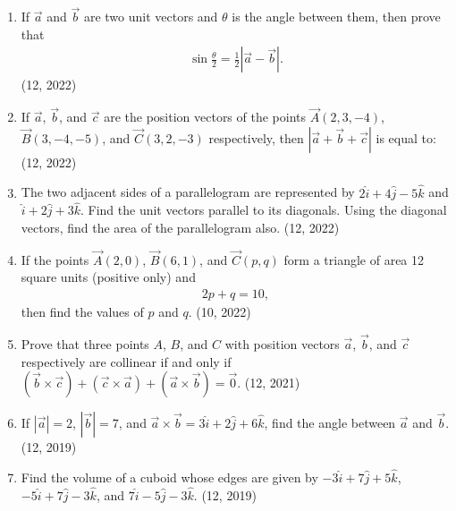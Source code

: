 \begin{enumerate}[label=\thesubsection.\arabic*,ref=\thesubsection.\theenumi]
    \item If $\overrightarrow{a}$ and $\overrightarrow{b}$ are two unit vectors and $\theta$ is the angle between them, then prove that
    \begin{align*}
        \sin \frac{\theta}{2} = \frac{1}{2} \left| \overrightarrow{a} - \overrightarrow{b} \right|.
    \end{align*}
    \hfill (12, 2022)
    \item If $\overrightarrow{a}$, $\overrightarrow{b}$, and $\overrightarrow{c}$ are the position vectors of the points $\vec{A}(2, 3, -4)$, $\vec{B}(3, -4, -5)$, and $\vec{C}(3, 2, -3)$ respectively, then $\left| \overrightarrow{a} + \overrightarrow{b} + \overrightarrow{c} \right|$ is equal to:
    \hfill (12, 2022)
    \item The two adjacent sides of a parallelogram are represented by $2\hat{i} + 4\hat{j} - 5\hat{k}$ and $\hat{i} + 2\hat{j} + 3\hat{k}$. Find the unit vectors parallel to its diagonals. Using the diagonal vectors, find the area of the parallelogram also.
    \hfill (12, 2022)
    \item If the points $\vec{A}(2,0)$, $\vec{B}(6,1)$, and $\vec{C}(p, q)$ form a triangle of area 12 square units (positive only) and
    \begin{align*}
        2p + q = 10,
    \end{align*}
    then find the values of $p$ and $q$.
    \hfill (10, 2022)
	\item Prove that three points $A$, $B$, and $C$ with position vectors $\vec{a}$, $\vec{b}$, and $\vec{c}$ respectively are collinear if and only if $(\vec{b} \times \vec{c}) + (\vec{c} \times \vec{a}) + (\vec{a} \times \vec{b}) = \vec{0}$. \hfill (12, 2021)
	\item If $|\overrightarrow{a}| = 2$, $|\overrightarrow{b}| = 7$, and $\overrightarrow{a} \times \overrightarrow{b} = 3\hat{i} + 2\hat{j} + 6\hat{k}$, find the angle between $\overrightarrow{a}$ and $\overrightarrow{b}$. \hfill (12, 2019)
	
	\item Find the volume of a cuboid whose edges are given by $-3\hat{i} + 7\hat{j} + 5\hat{k}$, $-5\hat{i} + 7\hat{j} - 3\hat{k}$, and $7\hat{i} - 5\hat{j} - 3\hat{k}$. \hfill (12, 2019)
	

\end{enumerate}
